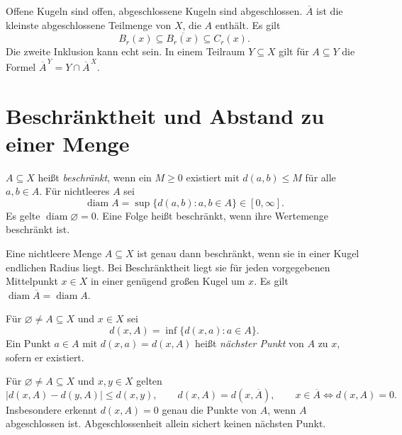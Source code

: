 \begin{theorem}
Offene Kugeln sind offen, abgeschlossene Kugeln sind abgeschlossen.
$\overline A$ ist die kleinste abgeschlossene Teilmenge von $X$, die $A$
enthält. Es gilt
\[
 B_r(x)\subseteq\overline{B_r(x)}\subseteq C_r(x).
\]
Die zweite Inklusion kann echt sein. In einem Teilraum $Y\subseteq X$ gilt
für $A\subseteq Y$ die Formel $\overline A^{\,Y}=Y\cap\overline A^{\,X}$.
\end{theorem}

\section{Beschränktheit und Abstand zu einer Menge}

\begin{definition}
\label{b47guide:def:diameter}
$A\subseteq X$ heißt \emph{beschränkt}, wenn ein $M\geq0$ existiert mit
$d(a,b)\leq M$ für alle $a,b\in A$. Für nichtleeres $A$ sei
\[
 \operatorname{diam}A=\sup\{d(a,b):a,b\in A\}\in[0,\infty].
\]
Es gelte $\operatorname{diam}\varnothing=0$. Eine Folge heißt beschränkt,
wenn ihre Wertemenge beschränkt ist.
\end{definition}

\begin{theorem}
Eine nichtleere Menge $A\subseteq X$ ist genau dann beschränkt, wenn sie in
einer Kugel endlichen Radius liegt. Bei Beschränktheit liegt sie für jeden
vorgegebenen Mittelpunkt $x\in X$ in einer genügend großen Kugel um $x$.
Es gilt $\operatorname{diam}\overline A=\operatorname{diam}A$.
\end{theorem}

\begin{definition}
Für $\varnothing\ne A\subseteq X$ und $x\in X$ sei
\[
 d(x,A)=\inf\{d(x,a):a\in A\}.
\]
Ein Punkt $a\in A$ mit $d(x,a)=d(x,A)$ heißt \emph{nächster Punkt} von $A$
zu $x$, sofern er existiert.
\end{definition}

\begin{theorem}
\label{b47guide:thm:distance-set}
Für $\varnothing\ne A\subseteq X$ und $x,y\in X$ gelten
\[
 |d(x,A)-d(y,A)|\leq d(x,y),\qquad
 d(x,A)=d(x,\overline A),\qquad
 x\in\overline A\iff d(x,A)=0.
\]
Insbesondere erkennt $d(x,A)=0$ genau die Punkte von $A$, wenn $A$
abgeschlossen ist. Abgeschlossenheit allein sichert keinen nächsten Punkt.
\end{theorem}

